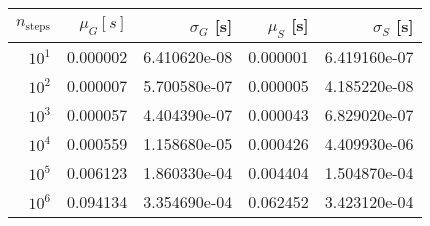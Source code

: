 \begin{tabular}{r|r|r|r|r}
\toprule
 $n_{\mathrm{steps}}$ &  $\mu_{G} [s]$ &  $\sigma_{G}$ [s] &  $\mu_{S}$ [s] &  $\sigma_{S}$ [s] \\
\midrule
                $10^1$ &       0.000002 &      6.410620e-08 &       0.000001 &      6.419160e-07 \\
                $10^2$ &       0.000007 &      5.700580e-07 &       0.000005 &      4.185220e-08 \\
                $10^3$ &       0.000057 &      4.404390e-07 &       0.000043 &      6.829020e-07 \\
                $10^4$ &       0.000559 &      1.158680e-05 &       0.000426 &      4.409930e-06 \\
                $10^5$ &       0.006123 &      1.860330e-04 &       0.004404 &      1.504870e-04 \\
                $10^6$ &       0.094134 &      3.354690e-04 &       0.062452 &      3.423120e-04 \\
\bottomrule
\end{tabular}
